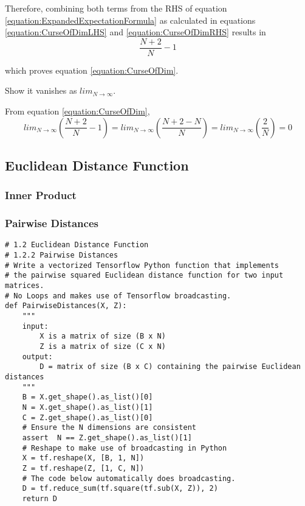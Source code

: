 \documentclass[a4paper,12pt]{article}
\begin{document}
Therefore, combining both terms from the RHS of equation  \ref{equation:ExpandedExpectationFormula} as calculated in equations \ref{equation:CurseOfDimLHS} and \ref{equation:CurseOfDimRHS}  results in 
\begin{equation}
 \frac{N + 2}{N} - 1
\end{equation} 

which proves equation \ref{equation:CurseOfDim}. 

Show it vanishes as $lim_{N\to\infty}$.

From equation \ref{equation:CurseOfDim}, 
\begin{equation}
\label{equation:CurseOfDimVanish}
lim_{N\to\infty} (\frac{N + 2}{N} - 1) = 
lim_{N\to\infty} (\frac{N + 2 - N}{N}) = 
lim_{N\to\infty} (\frac{2}{N}) = 0
\end{equation} 
\subsection{Euclidean Distance Function}
\subsubsection{Inner Product}
\subsubsection{Pairwise Distances}
\begin{verbatim}
# 1.2 Euclidean Distance Function 
# 1.2.2 Pairwise Distances
# Write a vectorized Tensorflow Python function that implements
# the pairwise squared Euclidean distance function for two input matrices.
# No Loops and makes use of Tensorflow broadcasting.
def PairwiseDistances(X, Z):
    """
    input:
        X is a matrix of size (B x N)
        Z is a matrix of size (C x N)
    output:
        D = matrix of size (B x C) containing the pairwise Euclidean distances
    """
    B = X.get_shape().as_list()[0]
    N = X.get_shape().as_list()[1]
    C = Z.get_shape().as_list()[0]
    # Ensure the N dimensions are consistent 
    assert  N == Z.get_shape().as_list()[1]
    # Reshape to make use of broadcasting in Python
    X = tf.reshape(X, [B, 1, N])
    Z = tf.reshape(Z, [1, C, N])
    # The code below automatically does broadcasting. 
    D = tf.reduce_sum(tf.square(tf.sub(X, Z)), 2)
    return D
\end{verbatim}

\end{document}
